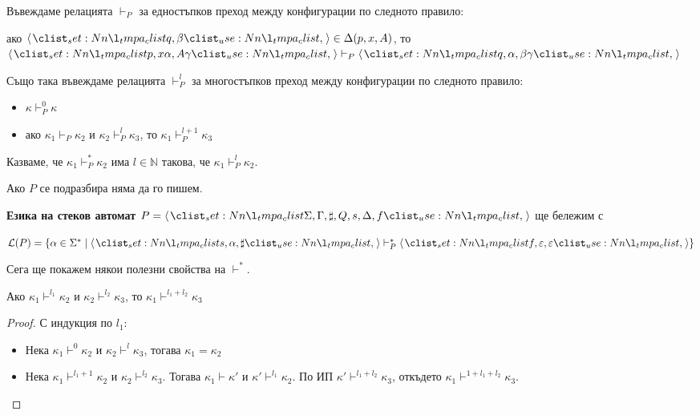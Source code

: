 \begin{definition}
    Въвеждаме релацията $\vdash_P$ за едностъпков преход между конфигурации по следното правило:

    \begin{center}
        ако $\opair{q, \beta} \in \Delta(p, x, A)$, то $\opair{p, x \alpha, A \gamma} \vdash_P \opair{q, \alpha, \beta \gamma}$
    \end{center}

    Също така въвеждаме релацията $\vdash_P^{l}$ за многостъпков преход между конфигурации по следното правило:

    \begin{itemize}
        \item $\kappa \vdash_P^0 \kappa$
        \item ако $\kappa_1 \vdash_P \kappa_2$ и $\kappa_2 \vdash_P^l \kappa_3$, то $\kappa_1 \vdash_P^{l + 1} \kappa_3$
    \end{itemize}

    Казваме, че $\kappa_1 \vdash_P^* \kappa_2$ има $l \in \mathbb{N}$ такова, че $\kappa_1 \vdash_P^l \kappa_2$.
\end{definition}

\begin{remark}
    Ако $P$ се подразбира няма да го пишем.
\end{remark}

\begin{definition}
    \textbf{Езика на стеков автомат $P = \opair{\Sigma, \Gamma, \sharp, Q, s, \Delta, f}$} ще бележим с

    \begin{center}
        $\mathcal{L}(P) = \{ \alpha \in \Sigma^* \mid \opair{s, \alpha, \sharp} \vdash_P^* \opair{f, \varepsilon, \varepsilon} \}$
    \end{center}
\end{definition}

Сега ще покажем някои полезни свойства на $\vdash^*$.

\begin{claim}
    Ако $\kappa_1 \vdash^{l_1} \kappa_2$ и $\kappa_2 \vdash^{l_2} \kappa_3$, то $\kappa_1 \vdash^{l_1 + l_2} \kappa_3$
\end{claim}

\begin{proof}
    С индукция по $l_1$:

    \begin{itemize}
        \item Нека $\kappa_1 \vdash^0 \kappa_2$ и $\kappa_2 \vdash^l \kappa_3$, тогава $\kappa_1 = \kappa_2$ \checkmark
        \item Нека $\kappa_1 \vdash^{l_1 + 1} \kappa_2$ и $\kappa_2 \vdash^{l_2} \kappa_3$.
              Тогава $\kappa_1 \vdash \kappa'$ и $\kappa' \vdash^{l_1} \kappa_2$.
              По ИП $\kappa' \vdash^{l_1 + l_2} \kappa_3$, откъдето $\kappa_1 \vdash^{1 + l_1 + l_2} \kappa_3$.
    \end{itemize}
\end{proof}

